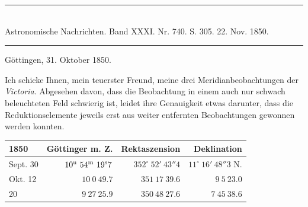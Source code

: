 \clearpage
\hypertarget{native-483-victoria}{}
\begin{center}
\rule{0.55\linewidth}{0.4pt}\\[2pt]
Astronomische Nachrichten. Band XXXI. Nr. 740. S. 305. 22. Nov. 1850.\\[2pt]
\rule{0.55\linewidth}{0.4pt}
\end{center}
\begin{flushright}Göttingen, 31. Oktober 1850.\end{flushright}

Ich schicke Ihnen, mein teuerster Freund, meine drei Meridianbeobachtungen der \emph{Victoria}. Abgesehen davon, dass die Beobachtung in einem auch nur schwach beleuchteten Feld schwierig ist, leidet ihre Genauigkeit etwas darunter, dass die Reduktionselemente jeweils erst aus weiter entfernten Beobachtungen gewonnen werden konnten.

\begin{center}
\setlength{\tabcolsep}{3pt}
\begin{tabular}{l|r|r|r}
1850 & Göttinger m. Z. & Rektaszension & Deklination \\\hline
Sept. 30 & $10^{\rm u}\ 54^{\rm m}\ 19^{\rm s}7$ & $352^\circ\ 52'\ 43''4$ & $11^\circ\ 16'\ 48''3$ N. \\
Okt. 12 & $10\ 0\ 49.7$ & $351\ 17\ 39.6$ & $9\ 5\ 23.0$ \\
\hfill 20 & $9\ 27\ 25.9$ & $350\ 48\ 27.6$ & $7\ 45\ 38.6$ \\
\end{tabular}
\end{center}
